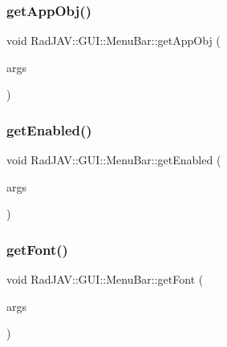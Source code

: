 \subsubsection{\texorpdfstring{get\+App\+Obj()}{getAppObj()}}
{\footnotesize\ttfamily void Rad\+J\+A\+V\+::\+G\+U\+I\+::\+Menu\+Bar\+::get\+App\+Obj (\begin{DoxyParamCaption}\item[{const v8\+::\+Function\+Callback\+Info$<$ v8\+::\+Value $>$ \&}]{args }\end{DoxyParamCaption})\hspace{0.3cm}{\ttfamily [static]}}

\mbox{\label{class_rad_j_a_v_1_1_g_u_i_1_1_menu_bar_af65360b61b092e1774c2640de05c14d3}} 
\subsubsection{\texorpdfstring{get\+Enabled()}{getEnabled()}}
{\footnotesize\ttfamily void Rad\+J\+A\+V\+::\+G\+U\+I\+::\+Menu\+Bar\+::get\+Enabled (\begin{DoxyParamCaption}\item[{const v8\+::\+Function\+Callback\+Info$<$ v8\+::\+Value $>$ \&}]{args }\end{DoxyParamCaption})\hspace{0.3cm}{\ttfamily [static]}}

\mbox{\label{class_rad_j_a_v_1_1_g_u_i_1_1_menu_bar_ac63cb09394d805188d7ee340e0b7f088}} 
\subsubsection{\texorpdfstring{get\+Font()}{getFont()}}
{\footnotesize\ttfamily void Rad\+J\+A\+V\+::\+G\+U\+I\+::\+Menu\+Bar\+::get\+Font (\begin{DoxyParamCaption}\item[{const v8\+::\+Function\+Callback\+Info$<$ v8\+::\+Value $>$ \&}]{args }\end{DoxyParamCaption})\hspace{0.3cm}{\ttfamily [static]}}

